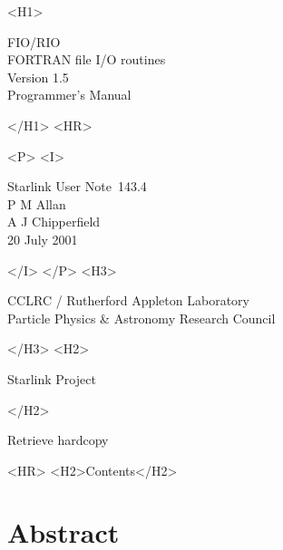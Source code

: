 \documentclass[twoside,11pt]{article}
\newcommand{\stardoccategory}  {Starlink User Note}
\newcommand{\stardocnumber}    {143.4}
\newcommand{\stardocauthors}   {P M Allan \\ A J Chipperfield}
\newcommand{\stardocdate}      {20 July 2001}
\newcommand{\stardoctitle}     {FIO/RIO \\ [1ex]
                                FORTRAN file I/O routines}
\newcommand{\stardocversion}   {Version 1.5}
\newcommand{\stardocmanual}    {Programmer's Manual}
\newcommand{\stardocsource}    {sun\stardocnumber}
\newcommand{\htmladdnormallink}[2]{#1}
\newcommand{\htmladdimg}[1]{}
\newcommand{\htmlref}[2]{#1}
\newcommand{\htmladdtonavigation}[1]{}
\newcommand{\xlabel}[1]{}
\renewcommand{\_}{\texttt{\symbol{95}}}
\begin{document}
\begin{htmlonly}
   \xlabel{}
   \begin{rawhtml} <H1> \end{rawhtml}
      \stardoctitle\\
      \stardocversion\\
      \stardocmanual
   \begin{rawhtml} </H1> <HR> \end{rawhtml}


   \begin{rawhtml} <P> <I> \end{rawhtml}
   \stardoccategory\ \stardocnumber \\
   \stardocauthors \\
   \stardocdate
   \begin{rawhtml} </I> </P> <H3> \end{rawhtml}
      \htmladdnormallink{CCLRC / Rutherford Appleton Laboratory}
                        {http://www.cclrc.ac.uk} \\
      \htmladdnormallink{Particle Physics \& Astronomy Research Council}
                        {http://www.pparc.ac.uk} \\
   \begin{rawhtml} </H3> <H2> \end{rawhtml}
      \htmladdnormallink{Starlink Project}{http://www.starlink.rl.ac.uk/}
   \begin{rawhtml} </H2> \end{rawhtml}
   \htmladdnormallink{\htmladdimg{source.gif} Retrieve hardcopy}
      {http://www.starlink.rl.ac.uk/cgi-bin/hcserver?\stardocsource}\\

  \label{stardoccontents}
  \begin{rawhtml} 
    <HR>
    <H2>Contents</H2>
  \end{rawhtml}
  \htmladdtonavigation{\htmlref{\htmladdimg{contents_motif.gif}}
        {stardoccontents}}

  \section{\xlabel{abstract}Abstract}
\end{htmlonly}
\end{document}
